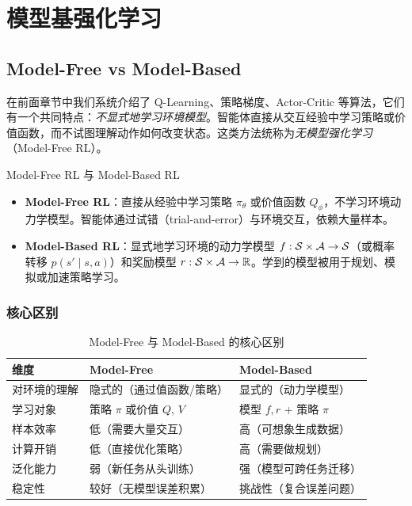 
\chapter{模型基强化学习}


\section{Model-Free vs Model-Based}

在前面章节中我们系统介绍了 Q-Learning、策略梯度、Actor-Critic 等算法，它们有一个共同特点：\emph{不显式地学习环境模型}。智能体直接从交互经验中学习策略或价值函数，而不试图理解动作如何改变状态。这类方法统称为\emph{无模型强化学习}（Model-Free RL）。

\begin{mydefinition}{Model-Free RL 与 Model-Based RL}
\begin{itemize}
    \item \textbf{Model-Free RL}：直接从经验中学习策略 $\pi_\theta$ 或价值函数 $Q_\phi$，不学习环境动力学模型。智能体通过试错（trial-and-error）与环境交互，依赖大量样本。
    \item \textbf{Model-Based RL}：显式地学习环境的动力学模型 $f: \mathcal{S} \times \mathcal{A} \to \mathcal{S}$（或概率转移 $p(s' \mid s, a)$）和奖励模型 $r: \mathcal{S} \times \mathcal{A} \to \mathbb{R}$。学到的模型被用于规划、模拟或加速策略学习。
\end{itemize}
\end{mydefinition}

\subsection{核心区别}

\begin{table}[H]
\centering
\caption{Model-Free 与 Model-Based 的核心区别}
\begin{tabular}{@{}p{3.5cm}p{5cm}p{5cm}@{}}
\toprule
\textbf{维度} & \textbf{Model-Free} & \textbf{Model-Based} \\
\midrule
对环境的理解 & 隐式的（通过值函数/策略） & 显式的（动力学模型） \\
学习对象 & 策略 $\pi$ 或价值 $Q$, $V$ & 模型 $f, r$ + 策略 $\pi$ \\
样本效率 & 低（需要大量交互） & 高（可想象生成数据） \\
计算开销 & 低（直接优化策略） & 高（需要做规划） \\
泛化能力 & 弱（新任务从头训练） & 强（模型可跨任务迁移） \\
稳定性 & 较好（无模型误差积累） & 挑战性（复合误差问题） \\
\bottomrule
\end{tabular}
\label{tab:mf_vs_mb}
\end{table}

